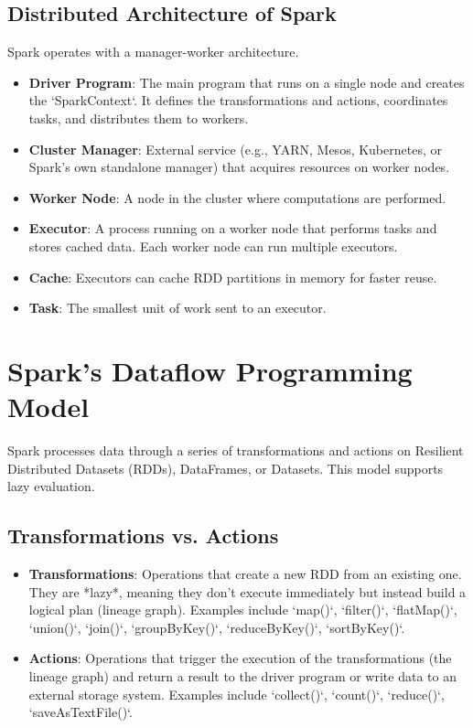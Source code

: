 \documentclass{article}
\begin{document}
\subsection*{Distributed Architecture of Spark}
Spark operates with a manager-worker architecture.
\begin{itemize}
    \item \textbf{Driver Program}: The main program that runs on a single node and creates the `SparkContext`. It defines the transformations and actions, coordinates tasks, and distributes them to workers.
    \item \textbf{Cluster Manager}: External service (e.g., YARN, Mesos, Kubernetes, or Spark's own standalone manager) that acquires resources on worker nodes.
    \item \textbf{Worker Node}: A node in the cluster where computations are performed.
    \item \textbf{Executor}: A process running on a worker node that performs tasks and stores cached data. Each worker node can run multiple executors.
    \item \textbf{Cache}: Executors can cache RDD partitions in memory for faster reuse.
    \item \textbf{Task}: The smallest unit of work sent to an executor.
\end{itemize}

\section*{Spark's Dataflow Programming Model}
Spark processes data through a series of transformations and actions on Resilient Distributed Datasets (RDDs), DataFrames, or Datasets. This model supports lazy evaluation.

\subsection*{Transformations vs. Actions}
\begin{itemize}
    \item \textbf{Transformations}: Operations that create a new RDD from an existing one. They are *lazy*, meaning they don't execute immediately but instead build a logical plan (lineage graph). Examples include `map()`, `filter()`, `flatMap()`, `union()`, `join()`, `groupByKey()`, `reduceByKey()`, `sortByKey()`.
    \item \textbf{Actions}: Operations that trigger the execution of the transformations (the lineage graph) and return a result to the driver program or write data to an external storage system. Examples include `collect()`, `count()`, `reduce()`, `saveAsTextFile()`.
\end{itemize}
\end{document}
